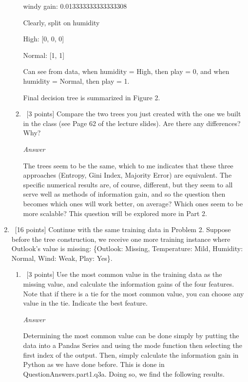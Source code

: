 \documentclass[12pt, fullpage,letterpaper]{article}
\begin{document}
\begin{enumerate}
\begin{enumerate}
    windy gain: 0.013333333333333308

    \vspace{5mm}
    
    Clearly, split on humidity
    
    \vspace{5mm}
    
    High: [0, 0, 0]
    
    Normal: [1, 1]

    \vspace{5mm}
    
    Can see from data, when humidity = High, then play = 0, and when humidity = Normal, then play = 1.
    
    \vspace{5mm}
    
    Final decision tree is summarized in Figure 2.
	
	\item~[3 points] Compare the two trees you just created with the one we built in the class (see Page 62 of the lecture slides). Are there any differences? Why?
	
	\emph{Answer}
	
	The trees seem to be the same, which to me indicates that these three approaches (Entropy, Gini Index, Majority Error) are equivalent. The specific numerical results are, of course, different, but they seem to all serve well as methods of information gain, and so the question then becomes which ones will work better, on average? Which ones seem to be more scalable? This question will be explored more in Part 2.
	
\end{enumerate}

\item~[16 points] Continue with the same training data in Problem 2. Suppose before the tree construction, we receive one more training instance where Outlook's value is missing: \{Outlook: Missing, Temperature: Mild, Humidity: Normal, Wind: Weak, Play: Yes\}. 

\begin{enumerate}
\item~[3 points] Use the most common value in the training data as the missing  value, and calculate the information gains of the four features. Note that if there is a tie for the most common value, you can choose any value in the tie.  Indicate the best feature. 

\emph{Answer}

Determining the most common value can be done simply by putting the data into a Pandas Series and using the mode function then selecting the first index of the output. Then, simply calculate the information gain in Python as we have done before. This is done in QuestionAnswers.part1.q3a. Doing so, we find the following results.


\end{enumerate}
\end{enumerate}
\end{document}
